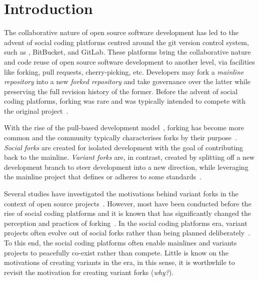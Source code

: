 \section{Introduction}
\label{sec:intro}

The collaborative nature of open source software development has led to the advent of social coding platforms centred around the git version control system, such as \gh, BitBucket, and GitLab.
These platforms bring the collaborative nature and code reuse of open source software development to another level, via facilities like forking, pull requests, cherry-picking, etc.
Developers may fork a \textit{mainline repository} into a new \textit{forked repository} and take governance over the latter while preserving the full revision history of the former.
Before the advent of social coding platforms, forking was rare and was typically intended to compete with the original project~\cite{Linus:2012Perspectives,Gregorio:2012,Viseur:2012Forks,Linus:2013CodeForking,Linus:2011ToFork,Gamalielsson:2014Sustainability}.

With the rise of the pull-based development model~\cite{Gousios:2014ICSE}, forking has become more common and the community typically characterises forks by their purpose~\cite{Zhou:2020}.
\textit{Social forks} are created for isolated development with the goal of contributing back to the mainline.
\textit{Variant forks} are, in contrast, created by splitting off a new development branch
to steer development into a new direction, while leveraging the mainline project that defines or adheres to some standards~\cite{sung:ICSE:2020}.

Several studies have investigated the motivations behind variant forks in the context of open source projects~\cite{Linus:2012Perspectives,Gregorio:2012,Viseur:2012Forks,Linus:2013CodeForking,Linus:2011ToFork,Gamalielsson:2014Sustainability}.
However, most have been conducted before the rise of social coding platforms and it is known that \gh has significantly changed the perception and practices of forking~\cite{Zhou:2020}.
In the social coding platforms era, variant projects often evolve out of social forks rather than being planned deliberately~\cite{Zhou:2020}.
To this end, the social coding platforms often enable mainlines and variants projects to peacefully co-exist rather than compete.
Little is know on the motivations of creating variants in the \gh era, in this sense, it is worthwhile
to revisit the motivation for creating variant forks (\textit{why?}).

